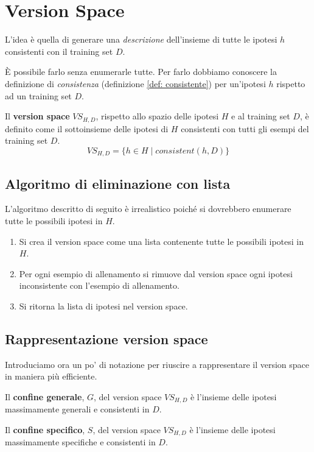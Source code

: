 \section{Version Space}
L'idea \`e quella di generare una \emph{descrizione} dell'insieme di tutte le ipotesi $h$ consistenti con il training
set $D$.

\`E possibile farlo senza enumerarle tutte. Per farlo dobbiamo conoscere la definizione di \emph{consistenza}
(definizione \ref{def: consistente}) per un'ipotesi $h$ rispetto ad un training set $D$.

\begin{definition}
	Il \textbf{version space} $VS_{H, D}$, rispetto allo spazio delle ipotesi $H$ e al training set $D$, \`e definito
	come il sottoinsieme delle ipotesi di $H$ consistenti con tutti gli esempi del training set $D$.
	\[ VS_{H, D} = \{ h \in H \mid consistent(h, D) \} \]
\end{definition}

\subsection{Algoritmo di eliminazione con lista}
L'algoritmo descritto di seguito \`e irrealistico poich\'e si dovrebbero enumerare tutte le possibili ipotesi in $H$.
\begin{enumerate}
	\item Si crea il version space come una lista contenente tutte le possibili ipotesi in $H$.
	\item Per ogni esempio di allenamento si rimuove dal version space ogni ipotesi inconsistente con l'esempio
	      di allenamento.
	\item Si ritorna la lista di ipotesi nel version space.
\end{enumerate}

\subsection{Rappresentazione version space}
Introduciamo ora un po' di notazione per riuscire a rappresentare il version space in maniera pi\`u efficiente.

\begin{definition}
	Il \textbf{confine generale}, $G$, del version space $VS_{H, D}$ \`e l'insieme delle ipotesi massimamente generali
	e consistenti in $D$.
\end{definition}

\begin{definition}
	Il \textbf{confine specifico}, $S$, del version space $VS_{H, D}$ \`e l'insieme delle ipotesi massimamente
	specifiche e consistenti in $D$.
\end{definition}

